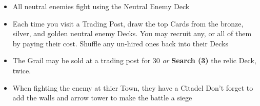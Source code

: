 \begin{multicols}{2}
\columnbreak

\begin{itemize}
\item All neutral enemies fight using the Neutral Enemy Deck
\item Each time you visit a Trading Post, draw the top Cards from the  bronze,  silver, and  golden neutral enemy Decks. 
You may recruit any, or all of them by paying their cost.
Shuffle any un-hired ones back into their Decks
\item The Grail may be sold at a trading post for 30  \textit{or} \textbf{Search (3)} the relic Deck, twice.
\item When fighting the enemy at thier Town, they have a Citadel
Don't forget to add the walls and arrow tower to make the battle a siege
\end{itemize}

\end{multicols}


\newpage

